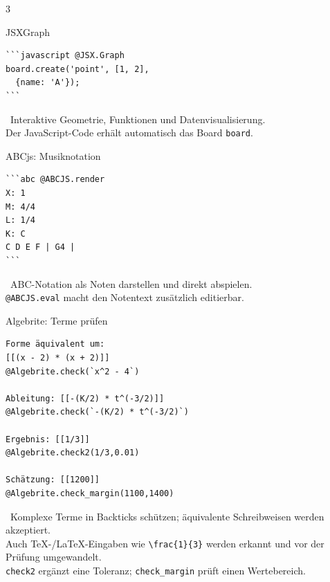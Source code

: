 \documentclass[a4paper,landscape,9pt]{extarticle}
\newcommand{\prevsm}[1]{{\footnotesize\color{muted} #1}}
\begin{document}
\begin{multicols}{3}

\begin{liacard}{JSXGraph}
\begin{lstlisting}[language=lia]
```javascript @JSX.Graph
board.create('point', [1, 2],
  {name: 'A'});
```
\end{lstlisting}
\tcblower
\prevsm{\faProjectDiagram~Interaktive Geometrie, Funktionen und Datenvisualisierung.\\[2pt]
Der JavaScript-Code erhält automatisch das Board \texttt{board}.}
\end{liacard}

\begin{liacard}{ABCjs: Musiknotation}
\begin{lstlisting}[language=lia]
```abc @ABCJS.render
X: 1
M: 4/4
L: 1/4
K: C
C D E F | G4 |
```
\end{lstlisting}
\tcblower
\prevsm{\faMusic~ABC-Notation als Noten darstellen und direkt abspielen.\\[2pt]
\texttt{@ABCJS.eval} macht den Notentext zusätzlich editierbar.}
\end{liacard}

\begin{liacard}{Algebrite: Terme prüfen}
\begin{lstlisting}[language=lia]
Forme äquivalent um:
[[(x - 2) * (x + 2)]]
@Algebrite.check(`x^2 - 4`)

Ableitung: [[-(K/2) * t^(-3/2)]]
@Algebrite.check(`-(K/2) * t^(-3/2)`)

Ergebnis: [[1/3]]
@Algebrite.check2(1/3,0.01)

Schätzung: [[1200]]
@Algebrite.check_margin(1100,1400)
\end{lstlisting}
\tcblower
\prevsm{\faCalculator~Komplexe Terme in Backticks schützen; äquivalente Schreibweisen werden akzeptiert.\\[2pt]
Auch TeX-/LaTeX-Eingaben wie \texttt{\textbackslash frac\{1\}\{3\}} werden erkannt und vor der Prüfung umgewandelt.\\[2pt]
\texttt{check2} ergänzt eine Toleranz; \texttt{check\_margin} prüft einen Wertebereich.}
\end{liacard}


\end{multicols}
\end{document}

